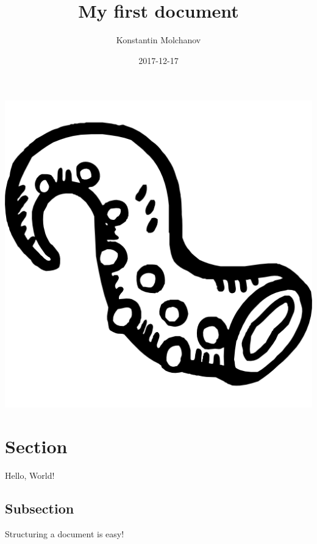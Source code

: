 \documentclass{article}
\title{My first document}
\date{2017-12-17}
\author{Konstantin Molchanov}
\begin{document}
    \maketitle
    \includegraphics[width=\linewidth]{octopus-black-512.png}
    \newpage

    \section{Section}

    Hello, World!

    \subsection{Subsection}

    Structuring a document is easy!
\end{document}
